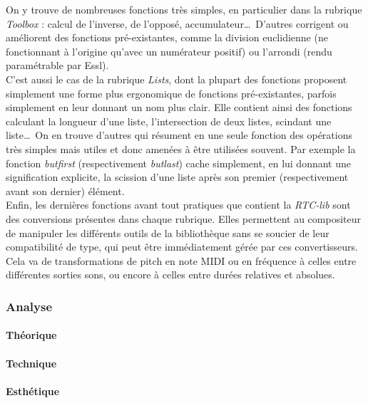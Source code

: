 \documentclass[a4paper,12pt]{article}
\begin{document}
On y trouve de nombreuses fonctions très simples, en particulier dans la rubrique \emph{Toolbox} : calcul de l'inverse, de l'opposé, accumulateur\dots~D'autres corrigent ou améliorent des fonctions pré-existantes, comme la division euclidienne (ne fonctionnant à l'origine qu'avec un numérateur positif) ou l'arrondi (rendu paramétrable par Essl). \\
C'est aussi le cas de la rubrique \emph{Lists}, dont la plupart des fonctions proposent simplement une forme plus ergonomique de fonctions pré-existantes, parfois simplement en leur donnant un nom plus clair. Elle contient ainsi des fonctions calculant la longueur d'une liste, l'intersection de deux listes, scindant une liste\dots~On en trouve d'autres qui résument en une seule fonction des opérations très simples mais utiles et donc amenées à être utilisées souvent. Par exemple la fonction \emph{butfirst} (respectivement \emph{butlast}) cache simplement, en lui donnant une signification explicite, la scission d'une liste après son premier (respectivement avant son dernier) élément. \\
Enfin, les dernières fonctions avant tout pratiques que contient la \emph{RTC-lib} sont des conversions présentes dans chaque rubrique. Elles permettent au compositeur de manipuler les différents outils de la bibliothèque sans se soucier de leur compatibilité de type, qui peut être immédiatement gérée par ces convertisseurs. Cela va de transformations de pitch en note MIDI ou en fréquence à celles entre différentes sorties sons, ou encore à celles entre durées relatives et absolues.

\subsubsection{Analyse}

\paragraph{Théorique}

\paragraph{Technique}

\paragraph{Esthétique}
\end{document}
